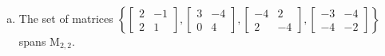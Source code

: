 \begin{exerciseAnswer}
\begin{enumerate}[(a)]
\item The set of matrices \( \left\{ \left[\begin{array}{cc}
2 & -1 \\
2 & 1
\end{array}\right] , \left[\begin{array}{cc}
3 & -4 \\
0 & 4
\end{array}\right] , \left[\begin{array}{cc}
-4 & 2 \\
2 & -4
\end{array}\right] , \left[\begin{array}{cc}
-3 & -4 \\
-4 & -2
\end{array}\right] \right\} \) spans \(\mathrm{M}_{2,2}\). 
\end{enumerate}
    
\end{exerciseAnswer}
    

